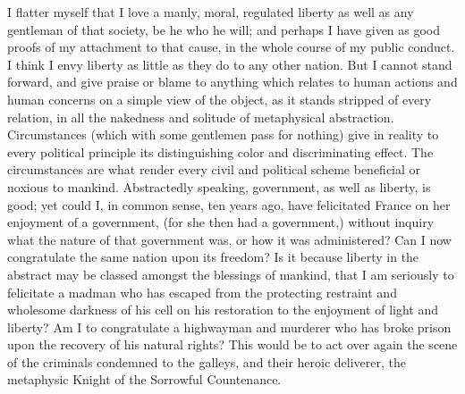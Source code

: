 I flatter myself that I love a manly, moral, regulated liberty as well as any gentleman of that society, be he who he will; and perhaps I have given as good proofs of my attachment to that cause, in the whole course of my public conduct. I think I envy liberty as little as they do to any other nation. But I cannot stand forward, and give praise or blame to anything which relates to human actions and human concerns on a simple view of the object, as it stands stripped of every relation, in all the nakedness and solitude of metaphysical abstraction. Circumstances (which with some gentlemen pass for nothing) give in reality to every political principle its distinguishing color and discriminating effect. The circumstances are what render every civil and political scheme beneficial or noxious to mankind. Abstractedly speaking, government, as well as liberty, is good; yet could I, in common sense, ten years ago, have felicitated France on her enjoyment of a government, (for she then had a government,) without inquiry what the nature of that government was, or how it was administered? Can I now congratulate the same nation upon its freedom? Is it because liberty in the abstract may be classed amongst the blessings of mankind, that I am seriously to felicitate a madman who has escaped from the protecting restraint and wholesome darkness of his cell on his restoration to the enjoyment of light and liberty? Am I to congratulate a highwayman and murderer who has broke prison upon the recovery of his natural rights? This would be to act over again the scene of the criminals condemned to the galleys, and their heroic deliverer, the metaphysic Knight of the Sorrowful Countenance.


